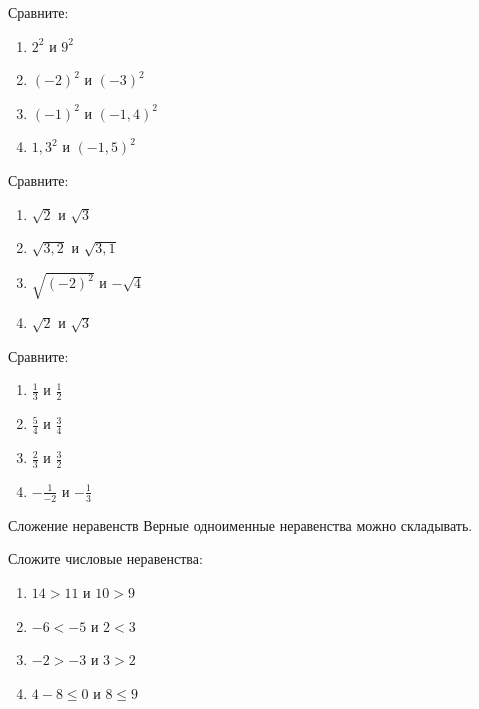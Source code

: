 \documentclass[algebra,twocolumn]{pum}
\begin{document}
\begin{question}
  Сравните:
  \begin{multicols}{2}
    \begin{enumerate}[label=\arabic*),nosep]
      \item $2^2$ и $9^2$
      \item $(-2)^2$ и $(-3)^2$
      \item $(-1)^2$ и $(-1,4)^2$
      \item $1,3^2$ и $(-1,5)^2$
    \end{enumerate}
  \end{multicols}
\end{question}
\begin{question}
  Сравните:
  \begin{multicols}{2}
    \begin{enumerate}[label=\arabic*),nosep]
    \item $\sqrt{2}$ и $\sqrt{3}$
    \item $\sqrt{3,2}$ и $\sqrt{3,1}$
    \item $\sqrt{(-2)^2}$ и $-\sqrt{4}$
    \item $\sqrt{2}$ и $\sqrt{3}$
  \end{enumerate}
  \end{multicols}
\end{question}
\begin{question}
  Сравните:
  \begin{multicols}{2}
    \begin{enumerate}[label=\arabic*)]
    \item $\frac{1}{3}$ и $\frac{1}{2}$
    \item $\frac{5}{4}$ и $\frac{3}{4}$
    \item $\frac{2}{3}$ и $\frac{3}{2}$
    \item $-\frac{1}{-2}$ и $-\frac{1}{3}$
  \end{enumerate}
  \end{multicols}
\end{question}

\begin{pumbox}{Сложение неравенств}
  Верные одноименные неравенства можно складывать.
\end{pumbox}

\begin{question}
  Сложите числовые неравенства:
  \begin{multicols}{2}
    \begin{enumerate}[label=\arabic*),nosep]
      \item $14>11$ и $10>9$
      \item $-6<-5$ и $2<3$
      \item $-2>-3$ и $3>2$
      \item $4-8\le 0$ и $8\le 9$
    \end{enumerate}
  \end{multicols}
\end{question}
\end{document}

